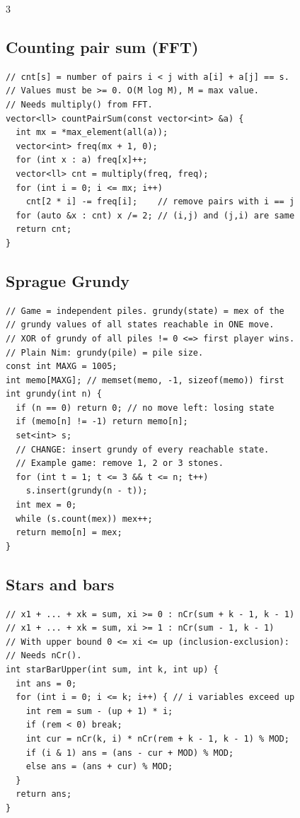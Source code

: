 \documentclass[8pt, a4paper]{article}
\begin{document}
\begin{multicols*}{3}
\subsection{Counting pair sum (FFT)}
\begin{lstlisting}
// cnt[s] = number of pairs i < j with a[i] + a[j] == s.
// Values must be >= 0. O(M log M), M = max value.
// Needs multiply() from FFT.
vector<ll> countPairSum(const vector<int> &a) {
  int mx = *max_element(all(a));
  vector<int> freq(mx + 1, 0);
  for (int x : a) freq[x]++;
  vector<ll> cnt = multiply(freq, freq);
  for (int i = 0; i <= mx; i++)
    cnt[2 * i] -= freq[i];    // remove pairs with i == j
  for (auto &x : cnt) x /= 2; // (i,j) and (j,i) are same
  return cnt;
}
\end{lstlisting}
\subsection{Sprague Grundy}
\begin{lstlisting}
// Game = independent piles. grundy(state) = mex of the
// grundy values of all states reachable in ONE move.
// XOR of grundy of all piles != 0 <=> first player wins.
// Plain Nim: grundy(pile) = pile size.
const int MAXG = 1005;
int memo[MAXG]; // memset(memo, -1, sizeof(memo)) first
int grundy(int n) {
  if (n == 0) return 0; // no move left: losing state
  if (memo[n] != -1) return memo[n];
  set<int> s;
  // CHANGE: insert grundy of every reachable state.
  // Example game: remove 1, 2 or 3 stones.
  for (int t = 1; t <= 3 && t <= n; t++)
    s.insert(grundy(n - t));
  int mex = 0;
  while (s.count(mex)) mex++;
  return memo[n] = mex;
}
\end{lstlisting}
\subsection{Stars and bars}
\begin{lstlisting}
// x1 + ... + xk = sum, xi >= 0 : nCr(sum + k - 1, k - 1)
// x1 + ... + xk = sum, xi >= 1 : nCr(sum - 1, k - 1)
// With upper bound 0 <= xi <= up (inclusion-exclusion):
// Needs nCr().
int starBarUpper(int sum, int k, int up) {
  int ans = 0;
  for (int i = 0; i <= k; i++) { // i variables exceed up
    int rem = sum - (up + 1) * i;
    if (rem < 0) break;
    int cur = nCr(k, i) * nCr(rem + k - 1, k - 1) % MOD;
    if (i & 1) ans = (ans - cur + MOD) % MOD;
    else ans = (ans + cur) % MOD;
  }
  return ans;
}
\end{lstlisting}

\end{multicols*}
\end{document}
